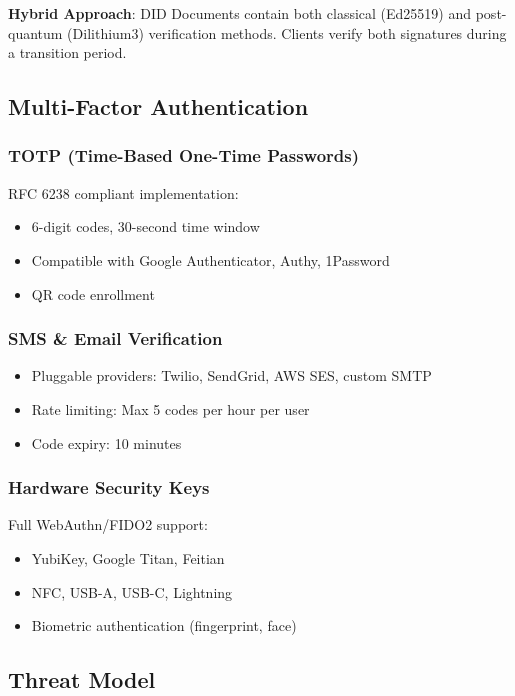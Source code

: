 \textbf{Hybrid Approach}: DID Documents contain both classical (Ed25519) and post-quantum (Dilithium3) verification methods. Clients verify both signatures during a transition period.

\subsection{Multi-Factor Authentication}

\subsubsection{TOTP (Time-Based One-Time Passwords)}

RFC 6238 \cite{rfc6238} compliant implementation:
\begin{itemize}
  \item 6-digit codes, 30-second time window
  \item Compatible with Google Authenticator, Authy, 1Password
  \item QR code enrollment
\end{itemize}

\subsubsection{SMS \& Email Verification}

\begin{itemize}
  \item Pluggable providers: Twilio, SendGrid, AWS SES, custom SMTP
  \item Rate limiting: Max 5 codes per hour per user
  \item Code expiry: 10 minutes
\end{itemize}

\subsubsection{Hardware Security Keys}

Full WebAuthn/FIDO2 support:
\begin{itemize}
  \item YubiKey, Google Titan, Feitian
  \item NFC, USB-A, USB-C, Lightning
  \item Biometric authentication (fingerprint, face)
\end{itemize}

\subsection{Threat Model}


